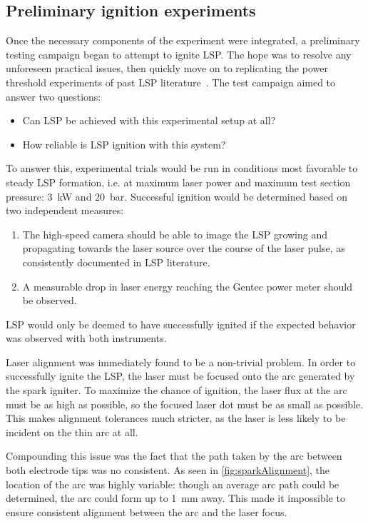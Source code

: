         \subsection{Preliminary ignition experiments} \label{sec:design_ignitiontest}
            Once the necessary components of the experiment were integrated, a preliminary testing campaign began to attempt to ignite LSP. The hope was to resolve any unforeseen practical issues, then quickly move on to replicating the power threshold experiments of past LSP literature~\cite{zimakovInteractionNearIRLaser2016,matsuiGeneratingConditionsArgon2019,luCharacteristicDiagnosticsLaserStabilized2022}. The test campaign aimed to answer two questions:
            \begin{itemize}
                \item Can LSP be achieved with this experimental setup at all?
                \item How reliable is LSP ignition with this system?
            \end{itemize}
            To answer this, experimental trials would be run in conditions most favorable to steady LSP formation, i.e. at maximum laser power and maximum test section pressure: \qty{3}{kW} and \qty{20}{bar}. Successful ignition would be determined based on two independent measures:
            \begin{enumerate}
                \item The high-speed camera should be able to image the LSP growing and propagating towards the laser source over the course of the laser pulse, as consistently documented in LSP literature.
                \item A measurable drop in laser energy reaching the Gentec power meter should be observed.
            \end{enumerate}
            LSP would only be deemed to have successfully ignited if the expected behavior was observed with both instruments.

            Laser alignment was immediately found to be a non-trivial problem. In order to successfully ignite the LSP, the laser must be focused onto the arc generated by the spark igniter. To maximize the chance of ignition, the laser flux at the arc must be as high as possible, so the focused laser dot must be as small as possible. This makes alignment tolerances much stricter, as the laser is less likely to be incident on the thin arc at all.

            Compounding this issue was the fact that the path taken by the arc between both electrode tips was no consistent. As seen in \autoref{fig:sparkAlignment}, the location of the arc was highly variable: though an average arc path could be determined, the arc could form up to \qty{1}{mm} away. This made it impossible to ensure consistent alignment between the arc and the laser focus.

